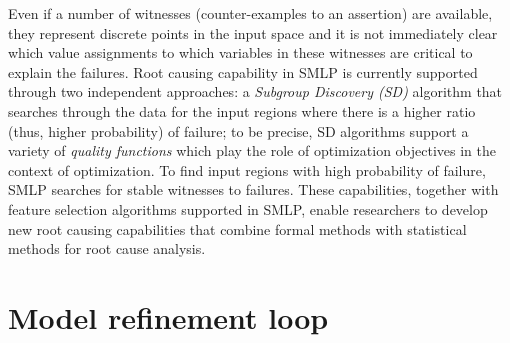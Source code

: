 \documentclass[a4paper,parskip=half]{article} %
\newcommand{\delete}[1]{}
\begin{document}
Even if a number of witnesses (counter-examples to an assertion) are available, they represent discrete points in the input space 
and it is not immediately clear which value assignments to which variables in these witnesses are critical to explain the failures. 
Root causing capability in SMLP is currently supported through two independent approaches:
a \emph{Subgroup Discovery (SD)} algorithm that searches through the data for the input regions where there is a higher ratio 
(thus, higher probability) of failure; to be precise, SD algorithms support a variety of \emph{quality functions} which play the role of 
optimization objectives in the context of optimization.
To find input regions with high probability of failure, SMLP searches for stable witnesses to failures. These capabilities, together with 
feature selection algorithms supported in SMLP, enable researchers to develop new root causing capabilities that combine formal 
methods with statistical methods for root cause analysis. 


\section{Model refinement loop}\label{sec:refinement}
\end{document}
